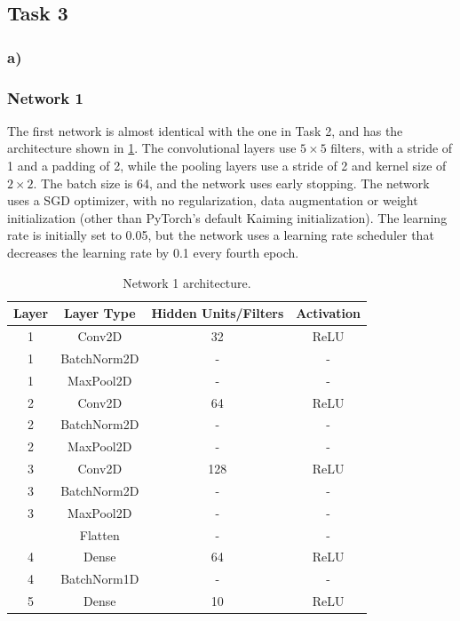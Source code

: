 \subsection*{Task 3}

\subsubsection*{a)}

\subsubsection*{Network 1}

The first network is almost identical with the one in Task 2, and has the architecture shown in \cref{tab:task3:net1}. The convolutional layers use $5\times5$ filters, with a stride of 1 and a padding of 2, while the pooling layers use a stride of 2 and kernel size of $2\times2$. The batch size is 64, and the network uses early stopping. The network uses a SGD optimizer, with no regularization, data augmentation or weight initialization (other than PyTorch's default Kaiming initialization). The learning rate is initially set to 0.05, but the network uses a learning rate scheduler that decreases the learning rate by 0.1 every fourth epoch. 

\begin{table}[h!]
    \centering
    \begin{tabular}{|c|c|c|c|}
      \hline
      Layer & Layer Type & Hidden Units/Filters & Activation \\
      \hline
      1 & Conv2D & 32 & ReLU \\
      1 & BatchNorm2D & - & - \\
      1 & MaxPool2D & - & - \\
      \hline
      2 & Conv2D & 64 & ReLU \\
      2 & BatchNorm2D & - & - \\
      2 & MaxPool2D & - & - \\
      \hline
      3 & Conv2D & 128 & ReLU \\
      3 & BatchNorm2D & - & - \\
      3 & MaxPool2D & - & - \\
      \hline
        & Flatten & - & - \\
      \hline
      4 & Dense & 64 & ReLU \\
      4 & BatchNorm1D & - & - \\
      \hline
      5 & Dense & 10 & ReLU \\
      \hline
    \end{tabular}
    \caption{Network 1 architecture.}
    \label{tab:task3:net1}
\end{table}


